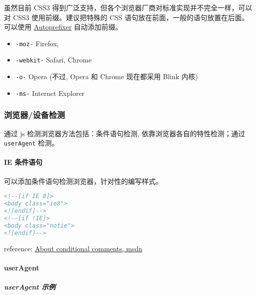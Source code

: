 虽然目前 CSS3
得到广泛支持，但各个浏览器厂商对标准实现并不完全一样，可以对 CSS3
使用前缀。建议把特殊的 CSS 语句放在前面，一般的语句放置在后面。可以使用
\href{https://github.com/search?utf8=\%E2\%9C\%93\&q=Autoprefixer}{Autoprefixer}
自动添加前缀。

\begin{itemize}
\tightlist
\item
  \lstinline!-moz-! Firefox,
\item
  \lstinline!-webkit-! Safari, Chrome
\item
  \lstinline!-o-! Opera (不过, Opera 和 Chrome 现在都采用 Blink 内核)
\item
  \lstinline!-ms-! Internet Explorer
\end{itemize}

\subsubsection{浏览器/设备检测}\label{ux6d4fux89c8ux5668ux8bbeux5907ux68c0ux6d4b}

通过 js 检测浏览器方法包括：条件语句检测, 依靠浏览器各自的特性检测；通过
\lstinline!userAgent! 检测。

\paragraph{IE 条件语句}\label{ie-ux6761ux4ef6ux8bedux53e5}

可以添加条件语句检测浏览器，针对性的编写样式。

\begin{lstlisting}[language=HTML]
<!--[if IE 8]>
<body class="ie8">
<![endif]-->
<!--[if !IE]>
<body class="notie">
<![endif]-->
\end{lstlisting}

reference:
\href{https://msdn.microsoft.com/en-us/library/ms537512(v=vs.85).aspx}{About
conditional comments, msdn}

\paragraph{userAgent}\label{useragent}

\subparagraph{userAgent 示例}\label{useragent-ux793aux4f8b}

